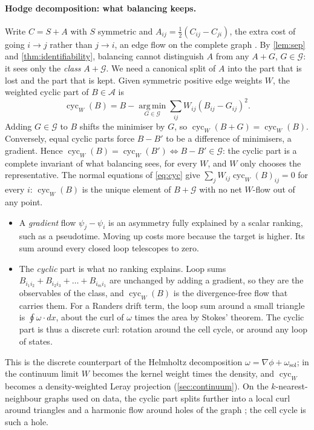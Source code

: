 \documentclass{article}
\theoremstyle{plain}
\theoremstyle{definition}
\theoremstyle{remark}
\newcommand{\1}{\mathbf{1}}
\newcommand{\Asym}{\mathcal{A}}
\newcommand{\Grad}{\mathcal{G}}
\newcommand{\cyc}{\operatorname{cyc}}
\begin{document}
\paragraph{Hodge decomposition: what balancing keeps.}
Write $C=S+A$ with $S$ symmetric and $A_{ij}=\tfrac12(C_{ij}-C_{ji})$, the
extra cost of going $i\to j$ rather than $j\to i$, an edge flow on the
complete graph \citep{jiang2011statistical,lim2020hodge}. By \cref{lem:sep} and
\cref{thm:identifiability}, balancing cannot distinguish $A$ from any
$A+G$, $G\in\Grad$: it sees only the \emph{class} $A+\Grad$. We need a canonical split of $A$
into the part that is lost and the part that is kept. Given symmetric positive edge weights $W$, the
weighted cyclic part of $B\in\Asym$ is
\begin{equation}
  \cyc_W(B) = B-\operatorname*{arg\,min}_{G\in\Grad}\textstyle\sum_{ij}W_{ij}(B_{ij}-G_{ij})^2 .
  \label{eq:cyc}
\end{equation}
Adding $G\in\Grad$ to $B$ shifts the minimiser by $G$, so
$\cyc_W(B+G)=\cyc_W(B)$. Conversely, equal cyclic parts force $B-B'$ to be
a difference of minimisers, a gradient. Hence
$\cyc_W(B)=\cyc_W(B')\iff B-B'\in\Grad$: the cyclic part is a complete
invariant of what balancing sees, for every $W$, and $W$ only chooses the
representative. The normal equations of \eqref{eq:cyc}
give $\sum_jW_{ij}\cyc_W(B)_{ij}=0$ for every $i$: $\cyc_W(B)$ is the
unique element of $B+\Grad$ with no net $W$-flow out of any point.

\begin{itemize}
  \item A \emph{gradient} flow $\psi_j-\psi_i$ is an asymmetry fully
    explained by a scalar ranking, such as a pseudotime. Moving up costs
    more because the target is higher. Its sum around every closed loop
    telescopes to zero.
  \item The \emph{cyclic} part is what no ranking explains. Loop sums
    $B_{i_1i_2}+B_{i_2i_3}+\dots+B_{i_mi_1}$ are unchanged by adding a
    gradient, so they are the observables of the class, and $\cyc_W(B)$
    is the divergence-free flow that carries them. For a Randers drift
    term, the loop sum around a small triangle is $\oint\omega\cdot dx$,
    about the curl of $\omega$ times the area by Stokes' theorem. The
    cyclic part is thus a discrete curl: rotation around the cell cycle,
    or around any loop of states.
\end{itemize}
This is the discrete counterpart of the Helmholtz decomposition
$\omega=\nabla\phi+\omega_{\mathrm{sol}}$; in the continuum limit $W$
becomes the kernel weight times the density, and $\cyc_W$ becomes a
density-weighted Leray projection (\cref{sec:continuum}). On the
$k$-nearest-neighbour graphs used on data, the cyclic part splits further into a local
curl around triangles and a harmonic flow around holes of the graph
\citep{jiang2011statistical}; the cell cycle is such a hole.
\end{document}
